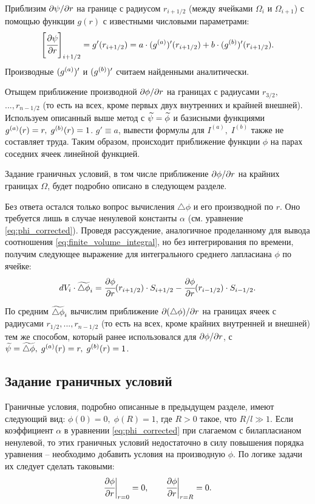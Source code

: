 Приблизим $\partial \psi / \partial r$ на границе с радиусом $r_{i + 1/2}$ (между ячейками $\Omega_i$ и $\Omega_{i + 1}$) с помощью функции $g(r)$ с известными числовыми параметрами:
$$\left[ \cfrac{\partial \psi}{\partial r} \right]_{i + 1/2} = g'(r_{i + 1/2}) = a \cdot ({g^{(a)}})'(r_{i + 1/2}) + b \cdot ({g^{(b)}})'(r_{i + 1/2}) {\text{.}}$$
Производные $({g^{(a)}})'$ и $({g^{(b)}})'$ считаем найденными аналитически.

Отыщем приближение производной $\partial \phi / \partial r$ на границах с радиусами $r_{3/2},$ $..., r_{n - 1/2}$ (то есть на всех, кроме первых двух внутренних и крайней внешней). Используем описанный выше метод с ${\widetilde{\psi}} = {\widetilde{\phi}}$ и базисными функциями ${g^{(a)}}(r) = r, \; {g^{(b)}}(r) = 1$. $g' \equiv a$, вывести формулы для $I^{(a)}, \; I^{(b)}$ также не составляет труда. Таким образом, происходит приближение функции $\phi$ на парах соседних ячеек линейной функцией.

Задание граничных условий, в том числе приближение $\partial \phi / \partial r$ на крайних границах $\Omega$, будет подробно описано в следующем разделе.

Без ответа остался только вопрос вычисления $\triangle \phi$ и его производной по $r$. Оно требуется лишь в случае ненулевой константы $\alpha$ (см. уравнение \eqref{eq:phi_corrected}). Проведя рассуждение, аналогичное проделанному для вывода соотношения \eqref{eq:finite_volume_integral}, но без интегрирования по времени, получим следующее выражение для интегрального среднего лапласиана $\phi$ по ячейке:
\begin{equation}
	dV_i \cdot {\widetilde{\triangle \phi}}_i = \cfrac{\partial \phi}{\partial r} (r_{i + 1/2}) \cdot S_{i + 1/2} - \cfrac{\partial \phi}{\partial r} (r_{i - 1/2}) \cdot S_{i - 1/2} {\text{.}}
	\label{eq:finite_volume_laplasian}
\end{equation}

По средним ${\widetilde{\triangle \phi}}_i$ вычислим приближение $\partial (\triangle \phi) / \partial r$ на границах ячеек с радиусами $r_{1/2}, ..., r_{n - 1/2}$ (то есть на всех, кроме крайних внутренней и внешней) тем же способом, который ранее использовался для $\partial \phi / \partial r$, с ${\widetilde{\psi}} = {\widetilde{\triangle \phi}}, \; {g^{(a)}}(r) = r, \; {g^{(b)}}(r) = 1$.


\subsection{Задание граничных условий}

Граничные условия, подробно описанные в предыдущем разделе, имеют следующий вид: $\phi(0) = 0, \; \phi(R) = 1$, где $R > 0$ такое, что $R / l \gg 1$. Если коэффициент $\alpha$ в уравнении \eqref{eq:phi_corrected} при слагаемом с билапласианом ненулевой, то этих граничных условий недостаточно в силу повышения порядка уравнения -- необходимо добавить условия на производную $\phi$. По логике задачи их следует сделать таковыми:
$$\cfrac{\partial \phi}{\partial r} \bigg|_{r = 0} = 0, \qquad \cfrac{\partial \phi}{\partial r} \bigg|_{r = R} = 0 {\text{.}}$$

